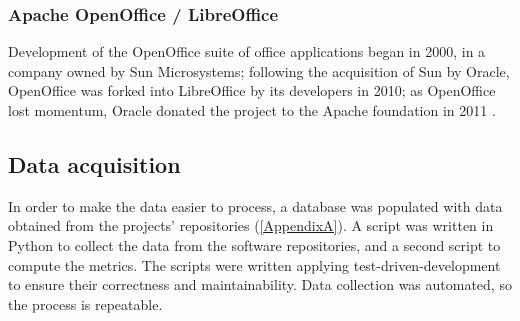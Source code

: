 \begin{description}
  
  
\end{description}

\subsubsection{Apache OpenOffice / LibreOffice}
Development of the OpenOffice suite of office applications began in 2000, in a company owned by Sun Microsystems; following the acquisition of Sun by Oracle, OpenOffice was forked into LibreOffice by its developers in 2010; as OpenOffice lost momentum, Oracle donated the project to the Apache foundation in 2011 \citep{Gamalielsson2014b}.

\begin{description}
  

\end{description}

\subsection{Data acquisition}
In order to make the data easier to process, a database was populated with data obtained from the projects' repositories (\ref{AppendixA}). A script was written in Python to collect the data from the software repositories, and a second script to compute the metrics. The scripts were written applying test-driven-development to ensure their correctness and maintainability. Data collection was automated, so the process is repeatable.

